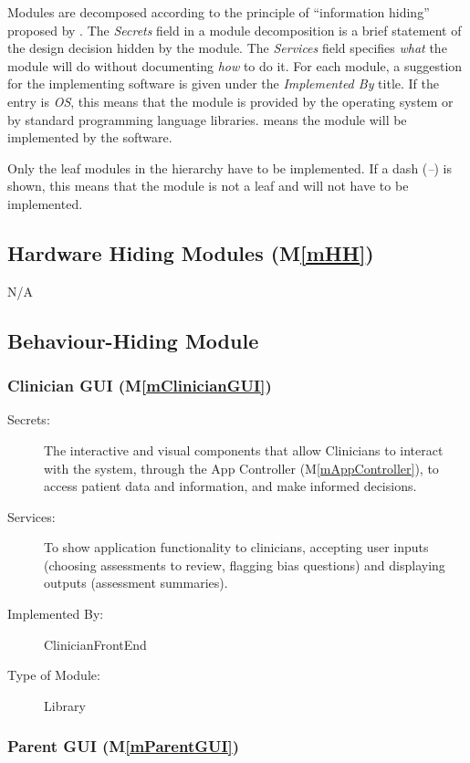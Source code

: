 \documentclass[12pt, titlepage]{article}
\newcommand{\mref}[1]{M\ref{#1}}
\begin{document}
Modules are decomposed according to the principle of ``information hiding''
proposed by \citet{ParnasEtAl1984}. The \emph{Secrets} field in a module
decomposition is a brief statement of the design decision hidden by the
module. The \emph{Services} field specifies \emph{what} the module will do
without documenting \emph{how} to do it. For each module, a suggestion for the
implementing software is given under the \emph{Implemented By} title. If the
entry is \emph{OS}, this means that the module is provided by the operating
system or by standard programming language libraries.  \emph{\progname{}} means the
module will be implemented by the \progname{} software.

Only the leaf modules in the hierarchy have to be implemented. If a dash
(\emph{--}) is shown, this means that the module is not a leaf and will not have
to be implemented.

\subsection{Hardware Hiding Modules (\mref{mHH})}
N/A

\subsection{Behaviour-Hiding Module}

\subsubsection{Clinician GUI (\mref{mClinicianGUI})}

\begin{description}
\item[Secrets:]The interactive and visual components that allow Clinicians to interact with the system, through the App Controller (\mref{mAppController}),
               to access patient data and information, and make informed decisions.
\item[Services:]To show application functionality to clinicians, accepting user inputs (choosing assessments to review,
                flagging bias questions) and displaying outputs (assessment summaries).
\item[Implemented By:] ClinicianFrontEnd
\item[Type of Module:] Library
\end{description}

\subsubsection{Parent GUI (\mref{mParentGUI})}
\end{document}
